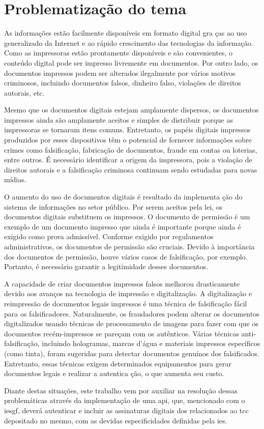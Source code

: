 \section{Problematização do tema}

As informações estão facilmente disponíveis em formato digital gra
ças ao uso generalizado da Internet e ao rápido crescimento das
tecnologias da informação.
Como as impressoras estão prontamente disponíveis e são
convenientes, o conteúdo digital pode ser
impresso livremente em documentos.
Por outro lado, os documentos impressos podem ser alterados
ilegalmente por vários motivos criminosos, incluindo documentos
falsos, dinheiro falso, violações
de direitos autorais, etc.\cite{tsai2019}

Mesmo que os documentos digitais estejam amplamente dispersos, os
documentos impressos ainda são amplamente aceitos e simples de
distribuir porque as impressoras se tornaram itens comuns.
Entretanto, os papéis digitais impressos produzidos por esses
dispositivos têm o potencial de fornecer informações sobre crimes
como falsificação, fabricação de documentos, fraude em contas ou
loterias, entre outros.
É necessário identificar a origem da impressora, pois a violação de
direitos autorais e a falsificação criminosa continuam sendo
estudadas para novas mídias.\cite{tsai2019}

O aumento do uso de documentos digitais é resultado da implementa
ção do sistema de informações no setor público.
Por serem aceitos pela lei, os documentos digitais substituem os
impressos.
O documento de permissão é um exemplo de um documento impresso que
ainda é importante porque ainda é exigido como prova admissível.
Conforme exigido por regulamentos administrativos, os documentos de
permissão são cruciais.
Devido à importância dos documentos de permissão, houve vários
casos de falsificação, por exemplo.
Portanto, é necessário garantir a legitimidade desses documentos.\cite{arief2019}

A capacidade de criar documentos impressos falsos melhorou
drasticamente devido aos avanços na tecnologia de impressão e
digitalização.
A digitalização e reimpressão de documentos legais impressos é uma
técnica de falsificação fácil para os falsificadores.
Naturalmente, os fraudadores podem alterar os documentos
digitalizados usando técnicas de processamento de imagens para
fazer com que os documentos recém-impressos se pareçam
com os autênticos.
Várias técnicas anti-falsificação, incluindo hologramas, marcas
d'água e materiais impressos específicos (como tinta), foram
sugeridas para detectar documentos genuínos dos falsificados.
Entretanto, essas técnicas exigem determinados equipamentos para
gerar documentos legais e realizar a autentica ção, o que aumenta
seu custo.\cite{zhang2019}

Diante destas situações, este trabalho vem por auxiliar na resolução
dessas problemáticas através da implementação de uma
\acrfull{api}, que, mencionado com o \acrlong{iesgf}, deverá
autenticar e incluir as assinaturas digitais dos relacionados ao
\acrfull{tcc} depositado no mesmo, com as devidas especificidades
definidas pela \acrshort{ies}.